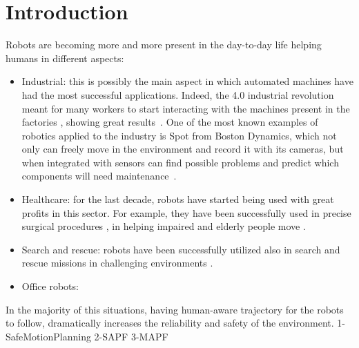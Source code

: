 \chapter{Introduction}
\label{ch:introduction}
Robots are becoming more and more present in the day-to-day life helping humans
in different aspects:
\begin{itemize}
  \item Industrial: this is possibly the main aspect in which automated
    machines have had the most successful applications. Indeed, the 4.0
    industrial revolution meant for many workers to start interacting with the
    machines present in the factories \cite{industry4_0}, showing great
    results~\cite{coordinationInWarehouse}. One of the most known examples of 
    robotics applied to the industry is Spot from Boston Dynamics, which not 
    only can freely move in the environment and record it with its cameras, but
    when integrated with sensors can find possible problems and predict which
    components will need maintenance~\cite{bostonDynamics}.
  \item Healthcare: for the last decade, robots have started being used with
    great profits in this sector. For example, they have been successfully used
    in precise surgical procedures \cite{surgicalRobot}, in helping impaired 
    and elderly people move \cite{friWalker}.
  \item Search and rescue: robots have been successfully utilized also in
    search and rescue missions in challenging environments
    \cite{searchRescueDrones}.
  \item Office robots:~\cite{cobots}
\end{itemize}
In the majority of this situations, having human-aware trajectory for the
robots to follow, dramatically increases the reliability and safety of the 
environment.
%
%
%
{1-SafeMotionPlanning}
{2-SAPF}
{3-MAPF}
